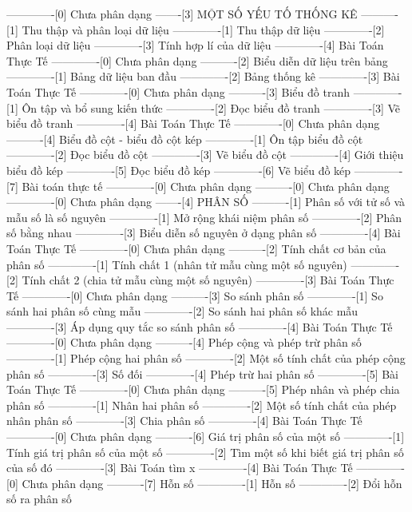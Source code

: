 -------------[0] Chưa phân dạng
-------[3] MỘT SỐ YẾU TỐ THỐNG KÊ
----------[1] Thu thập và phân loại dữ liệu
-------------[1] Thu thập dữ liệu
-------------[2] Phân loại dữ liệu
-------------[3] Tính hợp lí của dữ liệu
-------------[4] Bài Toán Thực Tế
-------------[0] Chưa phân dạng
----------[2] Biểu diễn dữ liệu trên bảng
-------------[1] Bảng dữ liệu ban đầu
-------------[2] Bảng thống kê
-------------[3] Bài Toán Thực Tế
-------------[0] Chưa phân dạng
----------[3] Biểu đồ tranh
-------------[1] Ôn tập và bổ sung kiến thức
-------------[2] Đọc biểu đồ tranh
-------------[3] Vẽ biểu đồ tranh
-------------[4] Bài Toán Thực Tế
-------------[0] Chưa phân dạng
----------[4] Biểu đồ cột - biểu đồ cột kép
-------------[1] Ôn tập biểu đồ cột
-------------[2] Đọc biểu đồ cột
-------------[3] Vẽ biểu đồ cột
-------------[4] Giới thiệu biểu đồ kép
-------------[5] Đọc biểu đồ kép
-------------[6] Vẽ biểu đồ kép
-------------[7] Bài toán thực tế
-------------[0] Chưa phân dạng
----------[0] Chưa phân dạng
-------------[0] Chưa phân dạng
-------[4] PHÂN SỐ
----------[1] Phân số với tử số và mẫu số là số nguyên
-------------[1] Mở rộng khái niệm phân số
-------------[2] Phân số bằng nhau
-------------[3] Biểu diễn số nguyên ở dạng phân số
-------------[4] Bài Toán Thực Tế
-------------[0] Chưa phân dạng
----------[2] Tính chất cơ bản của phân số
-------------[1] Tính chất 1 (nhân tử mẫu cùng một số nguyên)
-------------[2] Tính chất 2 (chia tử mẫu cùng một số nguyên)
-------------[3] Bài Toán Thực Tế
-------------[0] Chưa phân dạng
----------[3] So sánh phân số
-------------[1] So sánh hai phân số cùng mẫu
-------------[2] So sánh hai phân số khác mẫu
-------------[3] Áp dụng quy tắc so sánh phân số
-------------[4] Bài Toán Thực Tế
-------------[0] Chưa phân dạng
----------[4] Phép cộng và phép trừ phân số
-------------[1] Phép cộng hai phân số
-------------[2] Một số tính chất của phép cộng phân số
-------------[3] Số đối
-------------[4] Phép trừ hai phân số
-------------[5] Bài Toán Thực Tế
-------------[0] Chưa phân dạng
----------[5] Phép nhân và phép chia phân số
-------------[1] Nhân hai phân số
-------------[2] Một số tính chất của phép nhân phân số
-------------[3] Chia phân số
-------------[4] Bài Toán Thực Tế
-------------[0] Chưa phân dạng
----------[6] Giá trị phân số của một số
-------------[1] Tính giá trị phân số của một số
-------------[2] Tìm một số khi biết giá trị phân số của số đó
-------------[3] Bài Toán tìm x
-------------[4] Bài Toán Thực Tế
-------------[0] Chưa phân dạng
----------[7] Hỗn số
-------------[1] Hỗn số
-------------[2] Đổi hỗn số ra phân số
